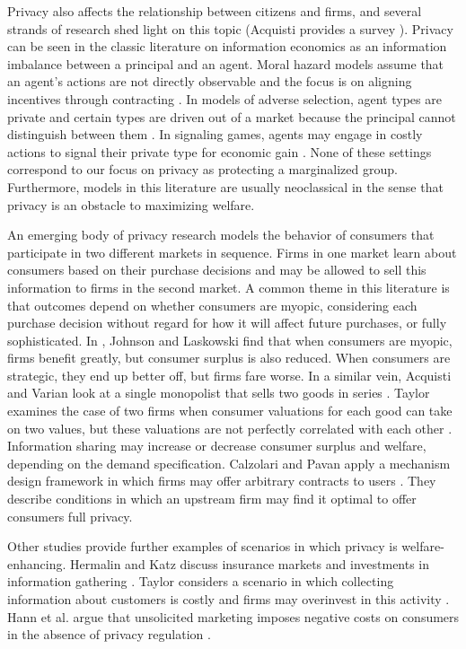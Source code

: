 Privacy also affects the relationship between citizens and firms, and several strands of research shed light on this topic (Acquisti provides a survey \cite{acquisti2010economics}).  Privacy can be seen in the classic literature on information economics as an information imbalance between a principal and an agent.  Moral hazard models assume that an agent's actions are not directly observable and the focus is on aligning incentives through contracting \cite{holmstrom1979moral}\cite{stiglitz1981credit}.  In models of adverse selection, agent types are private and certain types are driven out of a market because the principal cannot distinguish between them \cite{akerlof1995market}.  In signaling games, agents may engage in costly actions to signal their private type for economic gain \cite{spence1973job}.  None of these settings correspond to our focus on privacy as protecting a marginalized group.  Furthermore, models in this literature are usually neoclassical in the sense that privacy is an obstacle to maximizing welfare. 

An emerging body of privacy research models the behavior of consumers that participate in two different markets in sequence.  Firms in one market learn about consumers based on their purchase decisions and may be allowed to sell this information to firms in the second market.  A common theme in this literature is that outcomes depend on whether consumers are myopic, considering each purchase decision without regard for how it will affect future purchases, or fully sophisticated.  In \cite{johnsoncaviar}, Johnson and Laskowski find that when consumers are myopic, firms benefit greatly, but consumer surplus is also reduced. When consumers are strategic, they end up better off, but firms fare worse.  In a similar vein, Acquisti and Varian look at a single monopolist that sells two goods in series \cite{acquisti2005conditioning}.  Taylor examines the case of two firms when consumer valuations for each good can take on two values, but these valuations are not perfectly correlated with each other \cite{taylor2004consumer}.  Information sharing may increase or decrease consumer surplus and welfare, depending on the demand specification.  Calzolari and Pavan apply a mechanism design framework in which firms may offer arbitrary contracts to users \cite{calzolari2006optimality}.  They describe conditions in which an upstream firm may find it optimal to offer consumers full privacy.

Other studies provide further examples of scenarios in which privacy is welfare-enhancing.  Hermalin and Katz discuss insurance markets and investments in information gathering \cite{hermalin2006privacy}.  Taylor considers a scenario in which collecting information about customers is costly and firms may overinvest in this activity \cite{taylor2003privacy}.  Hann et al. argue that unsolicited marketing imposes negative costs on consumers in the absence of privacy regulation \cite{hann2008consumer}.

